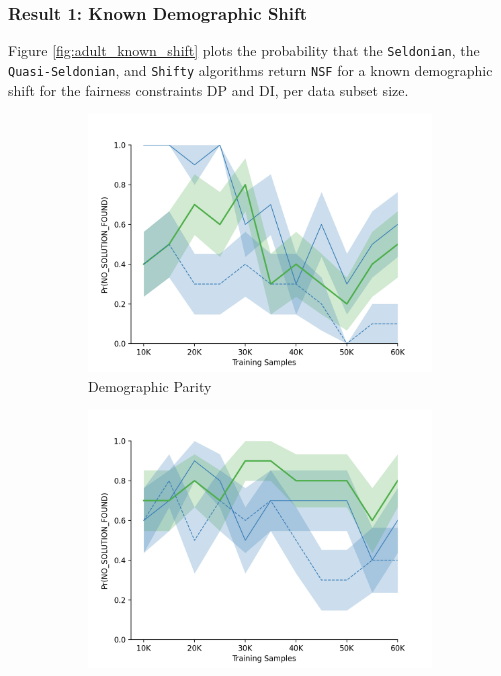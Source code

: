 \subsubsection{Result 1: Known Demographic Shift}\label{sec:results1}
Figure \ref{fig:adult_known_shift} plots the probability that the \texttt{Seldonian}, the \texttt{Quasi-Seldonian}, and \texttt{Shifty} algorithms return \texttt{NSF} for a known demographic shift for the fairness constraints DP and DI, per data subset size.

\begin{figure}[ht]
    \begin{subfigure}{0.5\linewidth}
      \centering
      \includegraphics[width=0.8\linewidth]{figures/iclr_fixed_demographic_shift_adult_rl/iclr_adult_fixed_ds_rl_dp.png}
      \caption{Demographic Parity}
      \label{fig:adult_k_dp}
    \end{subfigure}
    \begin{subfigure}{0.5\linewidth}
      \centering
      \includegraphics[width=0.8\linewidth]{figures/iclr_fixed_demographic_shift_adult_rl/iclr_adult_fixed_ds_rl_di.png}

\end{subfigure}
\end{figure}
